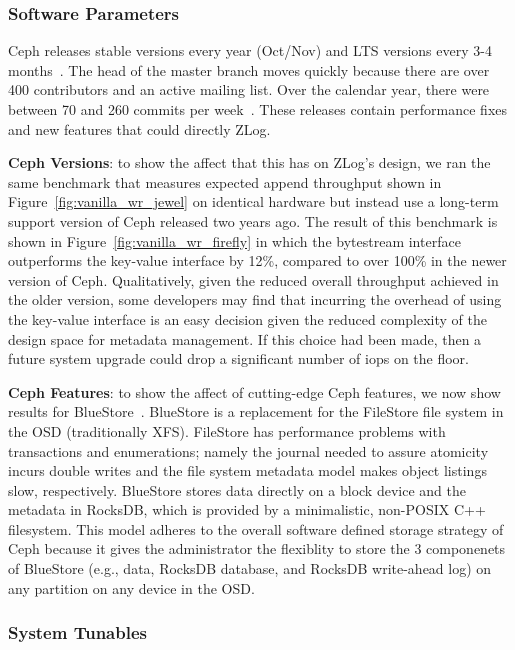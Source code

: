 \documentclass[10pt,twocolumn]{article}
\begin{document}
\subsubsection{Software Parameters}

Ceph releases stable versions every year (Oct/Nov) and LTS versions every 3-4
months~\cite{website:ceph-releases}. The head of the master branch moves
quickly because there are over 400 contributors and an active mailing list.
Over the calendar year, there were between  70 and 260 commits per
week~\cite{website:ceph-github}. These releases contain performance fixes and
new features that could directly ZLog. 

\textbf{Ceph Versions}: to show the affect that this has on ZLog's design, we
ran the same benchmark that measures expected append throughput shown in
Figure~\ref{fig:vanilla_wr_jewel} on identical hardware but instead use a
long-term support version of Ceph released two years ago. The result of this
benchmark is shown in Figure~\ref{fig:vanilla_wr_firefly} in which the
bytestream interface outperforms the key-value interface by 12\%, compared to
over 100\% in the newer version of Ceph. Qualitatively, given the reduced
overall throughput achieved in the older version, some developers may find that
incurring the overhead of using the key-value interface is an easy decision
given the reduced complexity of the design space for metadata management. If
this choice had been made, then a future system upgrade could drop a
significant number of iops on the floor.

\textbf{Ceph Features}: to show the affect of cutting-edge Ceph features, we
now show results for BlueStore~\cite{weil:vault2016-bluestore}. BlueStore is a
replacement for the FileStore file system in the OSD (traditionally XFS).
FileStore has performance problems with transactions and enumerations; namely
the journal needed to assure atomicity incurs double writes and the file system
metadata model makes object listings slow, respectively. BlueStore stores data
directly on a block device and the metadata in RocksDB, which is provided by a
minimalistic, non-POSIX C++ filesystem. This model adheres to the overall
software defined storage strategy of Ceph because it gives the administrator
the flexiblity to store the 3 componenets of BlueStore (e.g., data, RocksDB
database, and RocksDB write-ahead log) on any partition on any device in the
OSD. 

\subsubsection{System Tunables}
\end{document}
